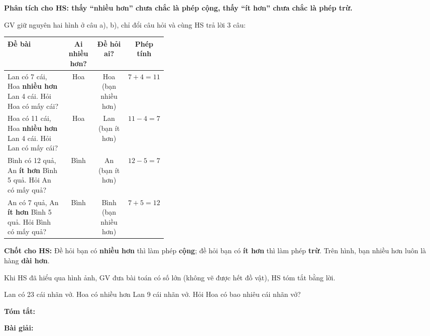 \documentclass[../main.tex]{subfiles}
\begin{document}
\begin{luuy}
    \textbf{Phân tích cho HS: thấy “nhiều hơn” chưa chắc là phép cộng, thấy “ít hơn” chưa chắc là phép trừ.}\par
    GV giữ nguyên hai hình ở câu a), b), chỉ đổi câu hỏi và cùng HS trả lời 3 câu: 
    \par\smallskip
    {\centering\small\renewcommand{\arraystretch}{1.35}
    \begin{tabular}{|p{0.37\linewidth}|c|c|c|}
        \hline
        \centering\textbf{Đề bài} & \textbf{Ai nhiều hơn?} & \textbf{Đề hỏi ai?} & \textbf{Phép tính} \\ \hline
        Lan có 7 cái, Hoa \textbf{nhiều hơn} Lan 4 cái. Hỏi Hoa có mấy cái? & Hoa & Hoa (bạn nhiều hơn) & $7 + 4 = 11$ \\ \hline
        Hoa có 11 cái, Hoa \textbf{nhiều hơn} Lan 4 cái. Hỏi Lan có mấy cái? & Hoa & Lan (bạn ít hơn) & $11 - 4 = 7$ \\ \hline
        Bình có 12 quả, An \textbf{ít hơn} Bình 5 quả. Hỏi An có mấy quả? & Bình & An (bạn ít hơn) & $12 - 5 = 7$ \\ \hline
        An có 7 quả, An \textbf{ít hơn} Bình 5 quả. Hỏi Bình có mấy quả? & Bình & Bình (bạn nhiều hơn) & $7 + 5 = 12$ \\ \hline
    \end{tabular}\par}
    \smallskip
    \textbf{Chốt cho HS:} Đề hỏi bạn có \textbf{nhiều hơn} thì làm phép \textbf{cộng}; đề hỏi bạn có \textbf{ít hơn} thì làm phép \textbf{trừ}. Trên hình, bạn nhiều hơn luôn là hàng \textbf{dài hơn}.
\end{luuy}
Khi HS đã hiểu qua hình ảnh, GV đưa bài toán có số lớn (không vẽ được hết đồ vật), HS tóm tắt bằng lời.
\begin{vd}
    Lan có 23 cái nhãn vở. Hoa có nhiều hơn Lan 9 cái nhãn vở. Hỏi Hoa có bao nhiêu cái nhãn vở?
\end{vd}
\noindent\begin{minipage}[t]{0.42\linewidth}
    \textbf{Tóm tắt:}
\end{minipage}\hfill
\begin{minipage}[t]{0.54\linewidth}
    \textbf{Bài giải:}
\end{minipage}
\end{document}
